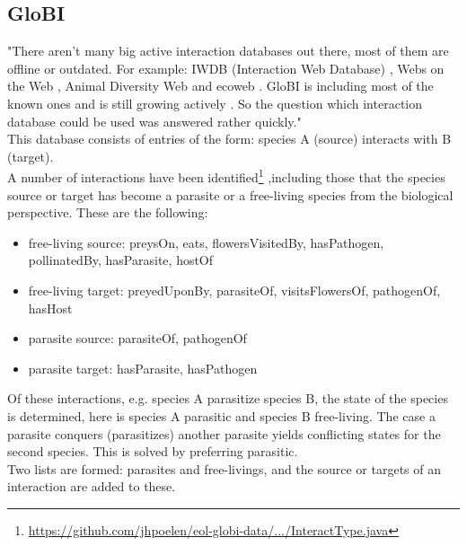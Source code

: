     \subsection{GloBI}
       "There aren't many big active interaction databases out there, most of them are 
        offline or outdated. For example: IWDB (Interaction Web Database) \cite{IWDB2003}, Webs on the 
        Web \cite{WOW2004}, Animal Diversity Web \cite{Myers2003} and ecoweb \cite{Cohen2010}. GloBI is 
        including most of the known ones and is still growing actively \cite{Poelen2014}. So the 
        question which interaction database could be used was answered rather quickly." \\

      This database consists of entries of the form: species A (source) interacts with B (target). \\
      A number of interactions have been identified\footnote{\hyperlink{
        https://github.com/jhpoelen/eol-globi-data/blob/master/eol-globi-lib/src/main/java/org/eol/globi/domain/InteractType.java
        }{https://github.com/jhpoelen/eol-globi-data/.../InteractType.java}}
        ,including those that the species source or target has become a parasite or a free-living 
        species from the biological perspective. These are the following:
      \begin{itemize}
        \item free-living source: preysOn, eats, flowersVisitedBy, hasPathogen, pollinatedBy, 
          hasParasite, hostOf
        \item free-living target: preyedUponBy, parasiteOf, visitsFlowersOf, pathogenOf, hasHost
        \item parasite source: parasiteOf, pathogenOf
        \item parasite target: hasParasite, hasPathogen
      \end{itemize}
      Of these interactions, e.g. species A parasitize species B, the state of the species is 
        determined, here is species A parasitic and species B free-living. The case a parasite 
        conquers (parasitizes) another parasite yields conflicting states for the second species. 
        This is solved by preferring parasitic. \\
      Two lists are formed: parasites and free-livings, and the source or targets of an interaction
        are added to these.

